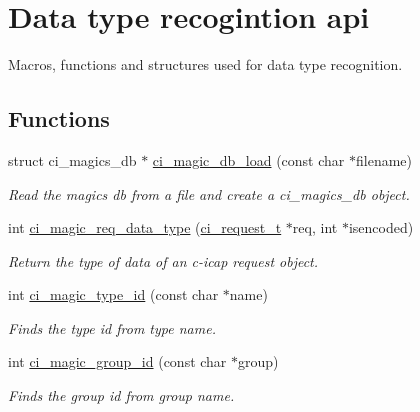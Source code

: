 \hypertarget{group__DATATYPE}{
\section{Data type recogintion api}
\label{group__DATATYPE}
}


Macros, functions and structures used for data type recognition.  
\subsection*{Functions}
\begin{DoxyCompactItemize}
\item 
struct ci\_\-magics\_\-db $\ast$ \hyperlink{group__DATATYPE_ga61edd8dcf006a279f7f310b5304c9127}{ci\_\-magic\_\-db\_\-load} (const char $\ast$filename)
\begin{DoxyCompactList}\small\item\em Read the magics db from a file and create a ci\_\-magics\_\-db object. \item\end{DoxyCompactList}\item 
int \hyperlink{group__DATATYPE_gafe67d34b80c1d9e4025201a8e54bd6d0}{ci\_\-magic\_\-req\_\-data\_\-type} (\hyperlink{group__REQUEST_ga27da5c4ae491f527ce36901c2e78ea04}{ci\_\-request\_\-t} $\ast$req, int $\ast$isencoded)
\begin{DoxyCompactList}\small\item\em Return the type of data of an c-\/icap request object. \item\end{DoxyCompactList}\item 
int \hyperlink{group__DATATYPE_ga46e48196d9902618161bdc1e160e8c00}{ci\_\-magic\_\-type\_\-id} (const char $\ast$name)
\begin{DoxyCompactList}\small\item\em Finds the type id from type name. \item\end{DoxyCompactList}\item 
int \hyperlink{group__DATATYPE_ga5f080fa00aab37ca373b4b695d68aafa}{ci\_\-magic\_\-group\_\-id} (const char $\ast$group)
\begin{DoxyCompactList}\small\item\em Finds the group id from group name. \item\end{DoxyCompactList}\item 

\end{DoxyCompactItemize}
